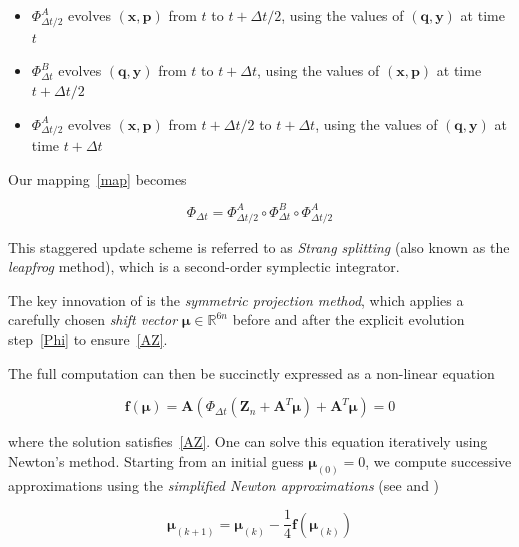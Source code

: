 \documentclass[12pt,a4paper]{article}
\theoremstyle{definition}
\theoremstyle{remark}
\begin{document}
\begin{itemize}
    \item $\Phi^A_{\Delta t / 2}$ evolves $(\mathbf{x}, \mathbf{p})$ from $t$ to $t + \Delta t / 2$, using the values of $(\mathbf{q}, \mathbf{y})$ at time $t$
    \item $\Phi^B_{\Delta t}$ evolves $(\mathbf{q}, \mathbf{y})$ from $t$ to $t + \Delta t$, using the values of $(\mathbf{x}, \mathbf{p})$ at time $t + \Delta t / 2$
    \item $\Phi^A_{\Delta t / 2}$ evolves $(\mathbf{x}, \mathbf{p})$ from $t + \Delta t / 2$ to $t + \Delta t$, using the values of $(\mathbf{q}, \mathbf{y})$ at time $t + \Delta t$
\end{itemize}

Our mapping~\eqref{map} becomes

\begin{equation}\label{Phi}
    \boxed{\Phi_{\Delta t} = \Phi^A_{\Delta t/2} \circ \Phi^B_{\Delta t} \circ \Phi^A_{\Delta t/2}}
\end{equation}

This staggered update scheme is referred to as \textit{Strang splitting} (also known as the \textit{leapfrog} method), which is a second-order symplectic integrator.

The key innovation of \citep{Jayawardana2023} is the \textit{symmetric projection method}, which applies a carefully chosen \textit{shift vector} $\boldsymbol{\mu} \in \mathbb{R}^{6n}$ before and after the explicit evolution step~\eqref{Phi} to ensure~\eqref{AZ}.

The full computation can then be succinctly expressed as a non-linear equation

\begin{equation}
    \mathbf{f}(\boldsymbol{\mu}) = \mathbf{A} (\Phi_{\Delta t}(\mathbf{Z}_n + \mathbf{A}^T \boldsymbol{\mu}) + \mathbf{A}^T \boldsymbol{\mu}) = 0
\end{equation}

where the solution satisfies~\eqref{AZ}. One can solve this equation iteratively using Newton's method. Starting from an initial guess $\boldsymbol{\mu}_{(0)} = 0$, we compute successive approximations using the \textit{simplified Newton approximations} (see \citep{Jayawardana2023} and \citep{Hairer2006})

\begin{equation}
    \boldsymbol{\mu}_{(k+1)} = \boldsymbol{\mu}_{(k)} - \frac{1}{4} \mathbf{f}(\boldsymbol{\mu}_{(k)})
\end{equation}
\end{document}
